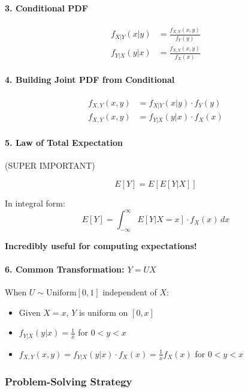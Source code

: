 \documentclass[11pt,letterpaper]{article}
\begin{document}
\paragraph{3. Conditional PDF}
\begin{align*}
f_{X|Y}(x|y) &= \frac{f_{X,Y}(x,y)}{f_Y(y)} \\
f_{Y|X}(y|x) &= \frac{f_{X,Y}(x,y)}{f_X(x)}
\end{align*}

\paragraph{4. Building Joint PDF from Conditional}
\begin{align*}
f_{X,Y}(x,y) &= f_{X|Y}(x|y) \cdot f_Y(y) \\
f_{X,Y}(x,y) &= f_{Y|X}(y|x) \cdot f_X(x)
\end{align*}

\paragraph{5. Law of Total Expectation} \textcolor{criticalcolor}{(SUPER IMPORTANT)}

\begin{tcolorbox}[colback=yellow!10,colframe=orange!80,title=Law of Total Expectation (Tower Property)]
\[
E[Y] = E[E[Y|X]]
\]

In integral form:
\[
E[Y] = \int_{-\infty}^{\infty} E[Y|X=x] \cdot f_X(x) \, dx
\]

\textbf{Incredibly useful for computing expectations!}
\end{tcolorbox}

\paragraph{6. Common Transformation: $Y = UX$}

When $U \sim \text{Uniform}[0,1]$ independent of $X$:
\begin{itemize}
  \item Given $X = x$, $Y$ is uniform on $[0, x]$
  \item $f_{Y|X}(y|x) = \frac{1}{x}$ for $0 < y < x$
  \item $f_{X,Y}(x,y) = f_{Y|X}(y|x) \cdot f_X(x) = \frac{1}{x} f_X(x)$ for $0 < y < x$
\end{itemize}

\subsubsection{Problem-Solving Strategy}
\end{document}
